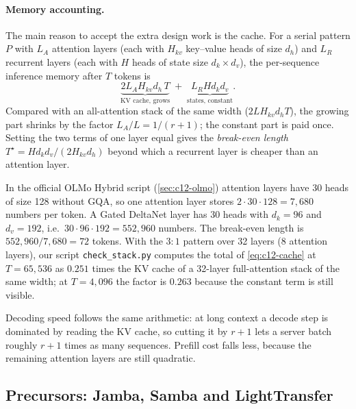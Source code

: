 \paragraph{Memory accounting.} The main reason to accept the extra design work is the cache.
For a serial pattern $P$ with $L_A$ attention layers (each with $H_{kv}$ key--value heads of
size $d_h$) and $L_R$ recurrent layers (each with $H$ heads of state size $d_k\times d_v$), the
per-sequence inference memory after $T$ tokens is
\begin{equation}\label{eq:c12-cache}
  \underbrace{2L_AH_{kv}d_h\,T}_{\text{KV cache, grows}} \;+\; \underbrace{L_RHd_kd_v}_{\text{states, constant}}.
\end{equation}
Compared with an all-attention stack of the same width ($2LH_{kv}d_hT$), the growing part shrinks
by the factor $L_A/L = 1/(r+1)$; the constant part is paid once. Setting the two terms of one
layer equal gives the \emph{break-even length} $T^\star = Hd_kd_v/(2H_{kv}d_h)$ beyond which a
recurrent layer is cheaper than an attention layer.

\begin{example}\label{ex:c12-olmo-cache}
In the official OLMo Hybrid script (\cref{sec:c12-olmo}) attention layers have 30 heads of size
128 without GQA, so one attention layer stores $2\cdot30\cdot128 = 7{,}680$ numbers per token.
A Gated DeltaNet layer has 30 heads with $d_k = 96$ and $d_v = 192$, i.e.\ $30\cdot96\cdot192 =
552{,}960$ numbers. The break-even length is $552{,}960/7{,}680 = 72$ tokens. With the $3{:}1$
pattern over 32 layers (8 attention layers), our script \texttt{check\_stack.py} computes the
total of \eqref{eq:c12-cache} at $T = 65{,}536$ as $0.251$ times the KV cache of a 32-layer
full-attention stack of the same width; at $T=4{,}096$ the factor is $0.263$ because the
constant term is still visible.
\end{example}

Decoding speed follows the same arithmetic: at long context a decode step is dominated by
reading the KV cache, so cutting it by $r+1$ lets a server batch roughly $r+1$ times as many
sequences. Prefill cost falls less, because the remaining attention layers are still
quadratic.

\subsection{Precursors: Jamba, Samba and LightTransfer}\label{sec:c12-precursors}

